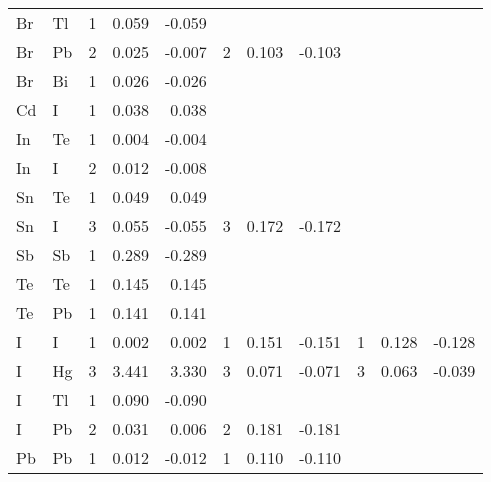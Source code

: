 \begin{table}
\begin{center}
\begin{tabular}{llrrrrrrrrr}
 Br &  Tl &   1 &    0.059 &   -0.059 &     &          &          &     &          &          \\
 Br &  Pb &   2 &    0.025 &   -0.007 &   2 &    0.103 &   -0.103 &     &          &          \\
 Br &  Bi &   1 &    0.026 &   -0.026 &     &          &          &     &          &          \\
 Cd &   I &   1 &    0.038 &    0.038 &     &          &          &     &          &          \\
 In &  Te &   1 &    0.004 &   -0.004 &     &          &          &     &          &          \\
 In &   I &   2 &    0.012 &   -0.008 &     &          &          &     &          &          \\
 Sn &  Te &   1 &    0.049 &    0.049 &     &          &          &     &          &          \\
 Sn &   I &   3 &    0.055 &   -0.055 &   3 &    0.172 &   -0.172 &     &          &          \\
 Sb &  Sb &   1 &    0.289 &   -0.289 &     &          &          &     &          &          \\
 Te &  Te &   1 &    0.145 &    0.145 &     &          &          &     &          &          \\
 Te &  Pb &   1 &    0.141 &    0.141 &     &          &          &     &          &          \\
  I &   I &   1 &    0.002 &    0.002 &   1 &    0.151 &   -0.151 &   1 &    0.128 &   -0.128 \\
  I &  Hg &   3 &    3.441 &    3.330 &   3 &    0.071 &   -0.071 &   3 &    0.063 &   -0.039 \\
  I &  Tl &   1 &    0.090 &   -0.090 &     &          &          &     &          &          \\
  I &  Pb &   2 &    0.031 &    0.006 &   2 &    0.181 &   -0.181 &     &          &          \\
 Pb &  Pb &   1 &    0.012 &   -0.012 &   1 &    0.110 &   -0.110 &     &          &          \\
\hline
\end{tabular}
\end{center}
\end{table}
